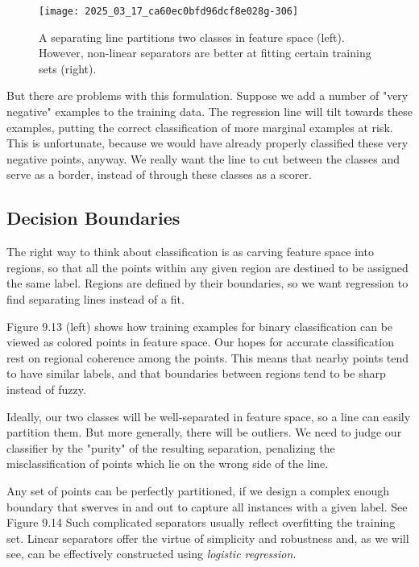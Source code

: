 \documentclass[10pt]{article}
\begin{document}
\begin{figure}[h]
    \centering
    \texttt{[image: 2025\_03\_17\_ca60ec0bfd96dcf8e028g-306]}
    \caption{A separating line partitions two classes in feature space (left). However, non-linear separators are better at fitting certain training sets (right).}
\end{figure}

But there are problems with this formulation. Suppose we add a number of "very negative" examples to the training data. The regression line will tilt towards these examples, putting the correct classification of more marginal examples at risk. This is unfortunate, because we would have already properly classified these very negative points, anyway. We really want the line to cut between the classes and serve as a border, instead of through these classes as a scorer.

\subsection{Decision Boundaries}
The right way to think about classification is as carving feature space into regions, so that all the points within any given region are destined to be assigned the same label. Regions are defined by their boundaries, so we want regression to find separating lines instead of a fit.

Figure 9.13 (left) shows how training examples for binary classification can be viewed as colored points in feature space. Our hopes for accurate classification rest on regional coherence among the points. This means that nearby points tend to have similar labels, and that boundaries between regions tend to be sharp instead of fuzzy.

Ideally, our two classes will be well-separated in feature space, so a line can easily partition them. But more generally, there will be outliers. We need to judge our classifier by the "purity" of the resulting separation, penalizing the misclassification of points which lie on the wrong side of the line.

Any set of points can be perfectly partitioned, if we design a complex enough boundary that swerves in and out to capture all instances with a given label. See Figure 9.14 Such complicated separators usually reflect overfitting the training set. Linear separators offer the virtue of simplicity and robustness and, as we will see, can be effectively constructed using \emph{logistic regression}.
\end{document}
